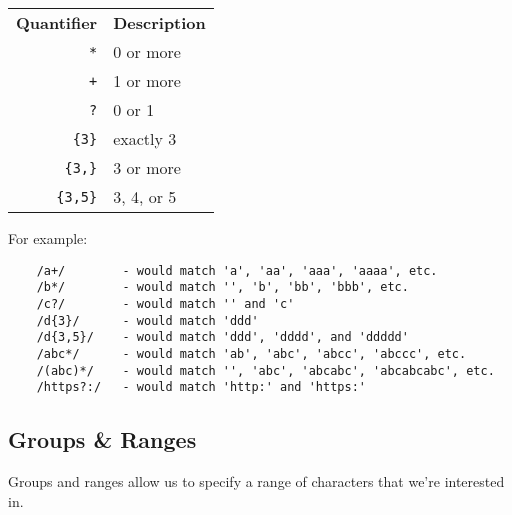 \begin{center}
    \begin{small}
        \begin{tabularx}{\textwidth}{r l}
            \textbf{Quantifier}   & \textbf{Description} \\
            \texttt{*}          & 0 or more \\
            \texttt{+}          & 1 or more \\
            \texttt{?}          & 0 or 1 \\
            \texttt{\{3\}}      & exactly 3 \\
            \texttt{\{3,\}}     & 3 or more \\
            \texttt{\{3,5\}}   & 3, 4, or 5
        \end{tabularx}
    \end{small}
\end{center}

For example:

\begin{verbatim}
    /a+/        - would match 'a', 'aa', 'aaa', 'aaaa', etc.
    /b*/        - would match '', 'b', 'bb', 'bbb', etc.
    /c?/        - would match '' and 'c'
    /d{3}/      - would match 'ddd'
    /d{3,5}/    - would match 'ddd', 'dddd', and 'ddddd'
    /abc*/      - would match 'ab', 'abc', 'abcc', 'abccc', etc.
    /(abc)*/    - would match '', 'abc', 'abcabc', 'abcabcabc', etc.
    /https?:/   - would match 'http:' and 'https:'
\end{verbatim}


\subsection{Groups \& Ranges}

Groups and ranges allow us to specify a range of characters that we're interested in.

